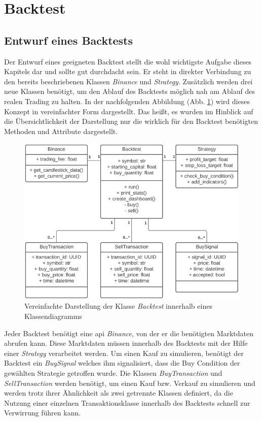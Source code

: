 \documentclass[oneside]{ausarbeitung}
\begin{document}

\section{Backtest}
\label{sec:backtest}

\subsection{Entwurf eines Backtests}
\label{sub:entwurf_eines_backtests}

Der Entwurf eines geeigneten Backtest stellt die wohl wichtigste Aufgabe dieses Kapitels dar und sollte gut durchdacht sein. Er steht in direkter Verbindung zu den bereits beschriebenen Klassen \textit{Binance} und \textit{Strategy}. Zusätzlich werden drei neue Klassen benötigt, um den Ablauf des Backtests möglich nah am Ablauf des realen Trading zu halten. In der nachfolgenden Abbildung (Abb. \ref{fig:12}) wird dieses Konzept in vereinfachter Form dargestellt. Das heißt, es wurden im Hinblick auf die Übersichtlichkeit der Darstellung nur die wirklich für den Backtest benötigten Methoden und Attribute dargestellt.

\begin{figure}[H]
  \centering
  \includegraphics[height=0.48\textheight]{uml/backtest_uml.png}
  \caption{Vereinfachte Darstellung der Klasse \textit{Backtest} innerhalb eines 		Klassendiagramms}
  \label{fig:12}
\end{figure}

Jeder Backtest benötigt eine \ac{api} \textit{Binance}, von der er die benötigten Marktdaten abrufen kann. Diese Marktdaten müssen innerhalb des Backtests mit der Hilfe einer \textit{Strategy} verarbeitet werden. Um einen Kauf zu simulieren, benötigt der Backtest ein \textit{BuySignal} welches ihm signalisiert, dass die Buy Condition der gewählten Strategie getroffen wurde. Die Klassen \textit{BuyTransaction} und \textit{SellTransaction} werden benötigt, um einen Kauf bzw. Verkauf zu simulieren und werden trotz ihrer Ähnlichkeit als zwei getrennte Klassen definiert, da die Nutzung einer einzelnen Transaktionsklasse innerhalb des Backtests schnell zur Verwirrung führen kann.
\end{document}
